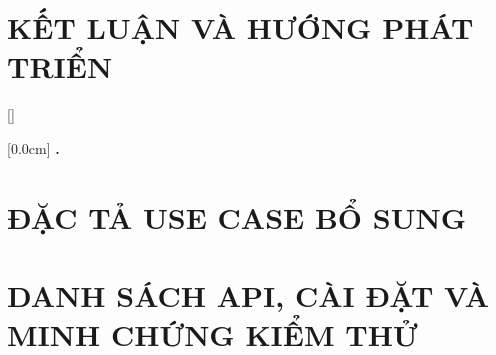 \documentclass[a4paper,13pt,3p,twoside]{report}
\theoremstyle{definition}
\begin{document}
\chapter{KẾT LUẬN VÀ HƯỚNG PHÁT TRIỂN} %
\label{chapter:conclusion}



\newpage
\renewcommand{\bibname}{TÀI LIỆU THAM KHẢO}


\appendixpage
\appendices
\addappheadtotoc


{}[]
\titlespacing*{\chapter}{0pt}{-20pt}{20pt}

    [0.0cm]             %
    {\bfseries\vspace{0.3cm}}                  %
    {{\bfseries{\scshape} \thecontentslabel.\ }} %
    {}         %
    {\contentspage}         %
\chapter{ĐẶC TẢ USE CASE BỔ SUNG}
\label{appendix:usecase}

\newpage
\chapter{DANH SÁCH API, CÀI ĐẶT VÀ MINH CHỨNG KIỂM THỬ}
\label{appendix:api}

\end{document}
